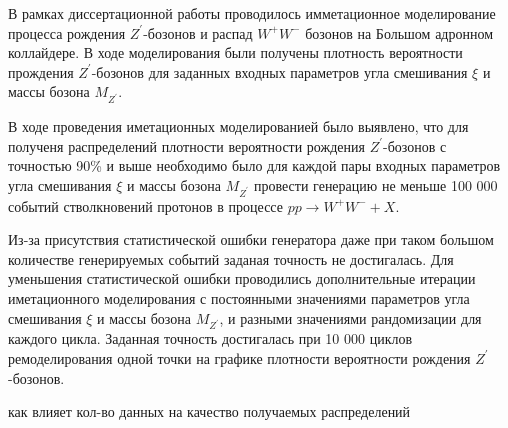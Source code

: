 В рамках диссертационной работы проводилось имметационное моделирование процесса рождения ${Z}^{\prime}$-бозонов и распад ${W}^{+}{W}^{-}$ бозонов на Большом адронном коллайдере. В ходе моделирования были получены плотность вероятности прождения ${Z}^{\prime}$-бозонов для заданных входных параметров угла смешивания $\xi$ и массы бозона ${M}_{{Z}^{\prime}}$.

В ходе проведения иметационных моделированией было выявлено, что для полученя распределений плотности вероятности рождения ${Z}^{\prime}$-бозонов с точностью 90\% и выше необходимо было для каждой пары входных параметров угла смешивания $\xi$ и массы бозона ${M}_{{Z}^{\prime}}$ провести генерацию не меньше 100 000 событий стволкновений протонов в процессе $pp \rightarrow W^+W^- + X$. 

Из-за присутствия статистической ошибки генератора даже при таком большом количестве генерируемых событий заданая точность не достигалась. Для уменьшения статистической ошибки проводились дополнительные итерации иметационного моделирования с постоянными значениями параметров угла смешивания $\xi$ и массы бозона ${M}_{{Z}^{\prime}}$, и разными значениями рандомизации для каждого цикла. Заданная точность достигалась при 10 000 циклов ремоделирования одной точки на графике плотности вероятности рождения ${Z}^{\prime}$-бозонов.

как влияет кол-во данных на качество получаемых распределений